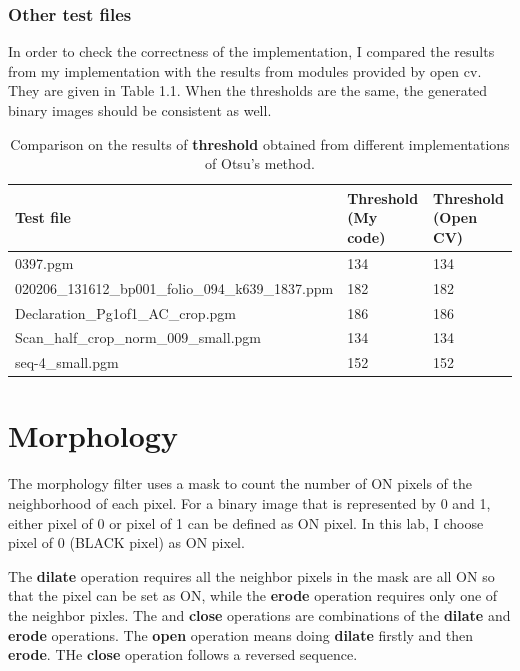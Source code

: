 \documentclass[paper=a4, fontsize=11pt]{scrartcl}
\numberwithin{equation}{section}		%
\numberwithin{figure}{section}			%
\numberwithin{table}{section}				%
\begin{document}
\subsubsection{Other test files}

In order to check the correctness of the implementation, I compared the results from my implementation with the results from modules provided by open cv.
They are given in Table 1.1. %
When the thresholds are the same, the generated binary images should be consistent as well.
\begin{table}
\label{tab:binary_comp}
\caption {Comparison on the results of \textbf{threshold} obtained from different implementations of Otsu's method.}
\begin{center}
\begin{tabular}{ | l | l | l | }
\hline
Test file & Threshold (My code) & Threshold (Open CV)  \\ \hline
0397.pgm                                          & 134 & 134 \\ \hline
020206\_131612\_bp001\_folio\_094\_k639\_1837.ppm & 182 & 182 \\ \hline
Declaration\_Pg1of1\_AC\_crop.pgm                 & 186 & 186 \\ \hline
Scan\_half\_crop\_norm\_009\_small.pgm            & 134 & 134 \\ \hline
seq-4\_small.pgm                                  & 152 & 152 \\ \hline
\end{tabular}
\end{center}
\end{table}


\section{Morphology}

The morphology filter uses a mask to count the number of ON pixels of the neighborhood of each pixel.
For a binary image that is represented by 0 and 1, either pixel of 0 or pixel of 1 can be defined as ON pixel. 
In this lab, I choose pixel of 0 (BLACK pixel) as ON pixel.

The \textbf{dilate} operation requires all the neighbor pixels in the mask are all ON so that the pixel can be set as ON, 
while the \textbf{erode} operation requires only one of the neighbor pixles.
The  and \textbf{close} operations are combinations of the \textbf{dilate} and \textbf{erode} operations.
The \textbf{open} operation means doing \textbf{dilate} firstly and then \textbf{erode}.
THe \textbf{close} operation follows a reversed sequence.
\end{document}
